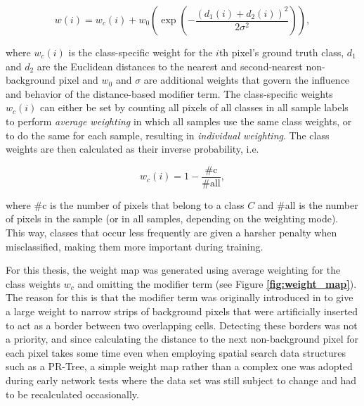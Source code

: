 \[ w(i) = w_c(i) + w_0 \left ( \exp \left (- \frac{(d_1(i) + d_2(i))^2}{2\sigma^2} \right ) \right ), \]

\noindent where $w_c(i)$ is the class-specific weight for the $i$th pixel's ground truth class, $d_1$ and $d_2$ are the Euclidean distances to the nearest and second-nearest non-background pixel and $w_0$ and $\sigma$ are additional weights that govern the influence and behavior of the distance-based modifier term. The class-specific weights $w_c(i)$ can either be set by counting all pixels of all classes in all sample labels to perform \textit{average weighting} in which all samples use the same class weights, or to do the same for each sample, resulting in \textit{individual weighting}. The class weights are then calculated as their inverse probability, i.e.

\[ w_c(i) = 1 - \frac{\text{\#c}}{\text{\#all}}, \]

\noindent where \#c is the number of pixels that belong to a class $C$ and \#all is the number of pixels in the sample (or in all samples, depending on the weighting mode). This way, classes that occur less frequently are given a harsher penalty when misclassified, making them more important during training.

For this thesis, the weight map was generated using average weighting for the class weights $w_c$ and omitting the modifier term (see Figure \textbf{\ref{fig:weight_map}}). The reason for this is that the modifier term was originally introduced in \cite{unet} to give a large weight to narrow strips of background pixels that were artificially inserted to act as a border between two overlapping cells. Detecting these borders was not a priority, and since calculating the distance to the next non-background pixel for each pixel takes some time even when employing spatial search data structures such as a PR-Tree,  a simple weight map rather than a complex one was adopted during early network tests where the data set was still subject to change and had to be recalculated occasionally.\\

